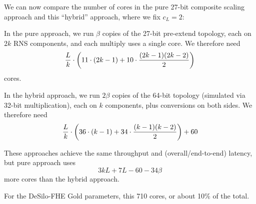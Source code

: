 \documentclass[../../fheimpl.tex]{subfiles}
\begin{document}
	We can now compare the number of cores in the pure 27-bit composite scaling approach and this ``hybrid'' approach, where we fix $c_L=2$:
	
	In the pure approach, we run $\beta$ copies of the 27-bit pre-extend topology, each on $2k$ RNS components, and each multiply uses a single core. We therefore need
	\[\frac{L}{k}\cdot\parens*{11\cdot(2k-1)+10\cdot\frac{(2k-1)(2k-2)}{2}}\]
	cores.
	
	In the hybrid approach, we run $2\beta$ copies of the 64-bit topology (simulated via 32-bit multiplication), each on $k$ components, plus conversions on both sides. We therefore need
	\[\frac{L}{k}\cdot\parens*{36\cdot(k-1)+34\cdot\frac{(k-1)(k-2)}{2}} + 60\]
	
	These approaches achieve the same throughput and (overall/end-to-end) latency, but pure approach uses 
	\[3kL+7L-60-34\beta\]
	more cores than the hybrid approach.
	
	For the DeSilo-FHE Gold parameters, this 710 cores, or about 10\% of the total.
	
\end{document}
